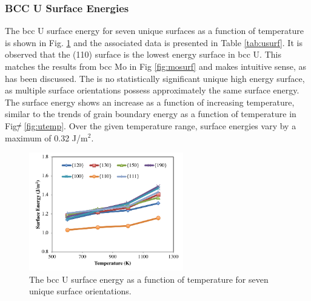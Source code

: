 \documentclass[review]{elsarticle}
\providecommand{\DIFaddtex}[1]{{\protect\color{blue}\uwave{#1}}} %
\providecommand{\DIFdeltex}[1]{{\protect\color{red}\sout{#1}}}                      %
\providecommand{\DIFaddbegin}{} %
\providecommand{\DIFaddend}{} %
\providecommand{\DIFdelbegin}{} %
\providecommand{\DIFdelend}{} %
\providecommand{\DIFadd}[1]{\texorpdfstring{\DIFaddtex{#1}}{#1}} %
\providecommand{\DIFdel}[1]{\texorpdfstring{\DIFdeltex{#1}}{}} %
\newcommand{\DIFscaledelfig}{0.5}
\newlength{\DIFdelgraphicswidth} %
\newlength{\DIFdelgraphicsheight} %
\newcommand{\DIFaddincludegraphics}[2][]{{\color{blue}\fbox{\DIFOincludegraphics[#1]{#2}}}} %
\newcommand{\DIFdelincludegraphics}[2][]{%
\sbox{\DIFdelgraphicsbox}{\DIFOincludegraphics[#1]{#2}}%
\settoboxwidth{\DIFdelgraphicswidth}{\DIFdelgraphicsbox} %
\settoboxtotalheight{\DIFdelgraphicsheight}{\DIFdelgraphicsbox} %
\scalebox{\DIFscaledelfig}{%
\parbox[b]{\DIFdelgraphicswidth}{\usebox{\DIFdelgraphicsbox}\\[-\baselineskip] \rule{\DIFdelgraphicswidth}{0em}}\llap{\resizebox{\DIFdelgraphicswidth}{\DIFdelgraphicsheight}{%
\setlength{\unitlength}{\DIFdelgraphicswidth}%
\begin{picture}(1,1)%
\thicklines\linethickness{2pt} %
{\color[rgb]{1,0,0}\put(0,0){\framebox(1,1){}}}%
{\color[rgb]{1,0,0}\put(0,0){\line( 1,1){1}}}%
{\color[rgb]{1,0,0}\put(0,1){\line(1,-1){1}}}%
\end{picture}%
}\hspace*{3pt}}} %
} %
\DeclareRobustCommand{\DIFaddbegin}{\DIFOaddbegin \let\includegraphics\DIFaddincludegraphics} %
\DeclareRobustCommand{\DIFaddend}{\DIFOaddend \let\includegraphics\DIFOincludegraphics} %
\DeclareRobustCommand{\DIFdelbegin}{\DIFOdelbegin \let\includegraphics\DIFdelincludegraphics} %
\DeclareRobustCommand{\DIFdelend}{\DIFOaddend \let\includegraphics\DIFOincludegraphics} %
\begin{document}
\FloatBarrier


\subsubsection{BCC U Surface Energies}

The bcc U surface energy for seven unique surfaces as a function of temperature is shown in Fig. \ref{fig:usurf} and the associated data is presented in Table \ref{tab:usurf}. It is observed that the (110) surface is the lowest energy surface in bcc U. This matches the results from bcc Mo in Fig \ref{fig:mosurf} and makes intuitive sense, as has been discussed. The is no statistically significant unique high energy surface, as multiple surface orientations possess approximately the same surface energy. The surface energy shows an increase as a function of increasing temperature, similar to the trends of grain boundary energy as a function of temperature in Fig\DIFdelbegin \DIFdel{/ }\DIFdelend \DIFaddbegin \DIFadd{. }\DIFaddend \ref{fig:utemp}. Over the given temperature range, surface energies vary by a maximum of 0.32 J/m$^{2}$.

\begin{figure}[h]
 \centering
 \includegraphics[width=0.6\textwidth]{usurf.png} 
 \caption{The bcc U surface energy as a function of temperature for seven unique surface orientations.}
 \label{fig:usurf}
\end{figure}
\end{document}
